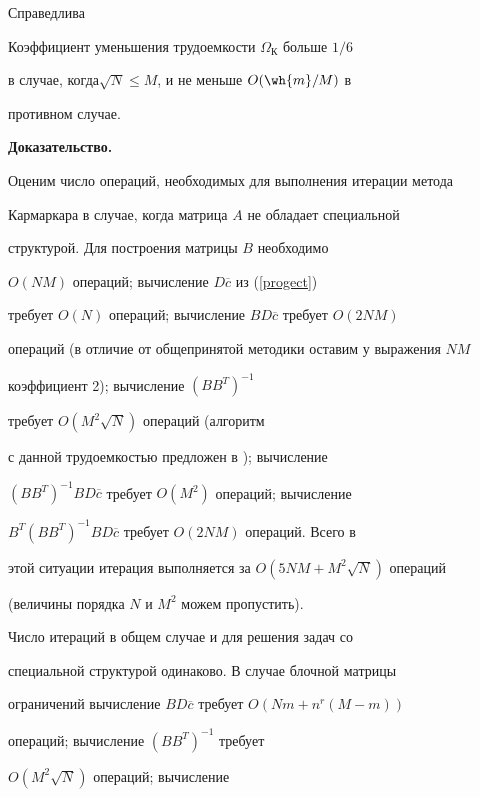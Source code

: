 Справедлива





\begin{lem}\label{OKUTKB}


Коэффициент уменьшения трудоемкости $\Omega_К$ больше $1/6$


в случае, когда\linebreak $\sqrt{N}\leq M$, и не меньше $O(\wh{m}/M)$ в


противном случае.


\end{lem}





{\bf Доказательство.}


Оценим число операций, необходимых для выполнения итерации метода


Кармаркара в случае, когда матрица $A$ не обладает специальной


структурой. Для построения матрицы $B$ необходимо


$O(NM)$ операций; вычисление $D\overline{c}$ из (\ref{progect})


требует $O(N)$ операций; вычисление $BD\overline{c}$ требует $O(2NM)$


операций (в отличие от общепринятой методики оставим у выражения $NM$


коэффициент 2); вычисление $(BB^T)^{-1}$


требует $O(M^2\sqrt{N})$ операций (алгоритм


с данной трудоемкостью предложен в \cite{Karmar}); вычисление


$(BB^T)^{-1}BD\overline{c}$ требует $O(M^2)$ операций; вычисление


$B^T(BB^T)^{-1}BD\overline{c}$ требует $O(2NM)$ операций. Всего в


этой ситуации итерация выполняется за $O(5NM+M^2\sqrt{N})$ операций


(величины порядка $N$ и $M^2$ можем пропустить).





Число итераций в общем случае и для решения задач со


специальной структурой одинаково.  В случае блочной матрицы


ограничений вычисление $BD\overline{c}$ требует $O(Nm+n^r(M-m))$


операций; вычисление $(BB^T)^{-1}$ требует


$O(M^2\sqrt{N})$ операций; вычисление


